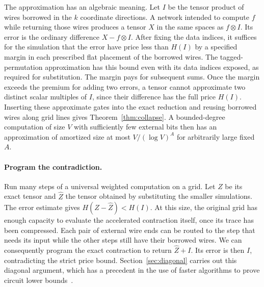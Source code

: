 The approximation has an algebraic meaning. Let \(I\) be the tensor
product of wires borrowed in the \(k\) coordinate directions. A
network intended to compute \(f\) while returning those wires produces
a tensor \(X\) in the same spaces as \(f\otimes I\). Its error is the
ordinary difference \(X-f\otimes I\). After fixing the data indices,
it suffices for the simulation that the error have price less than
\(H(I)\) by a specified margin in each prescribed flat placement of
the borrowed wires. The tagged-permutation approximation has this
bound even with its data indices exposed, as required for substitution. The
margin pays for subsequent sums. Once the margin exceeds the premium for adding two errors, a tensor
cannot approximate two distinct scalar multiples of \(I\), since their
difference has the full price \(H(I)\). Inserting these approximate gates into the exact
reduction and reusing borrowed wires along grid lines gives
Theorem~\ref{thm:collapse}. A bounded-degree computation of size \(V\)
with sufficiently few external bits then has an approximation of amortized
size at most \(V/(\log V)^A\) for arbitrarily large fixed \(A\).

\paragraph{Program the contradiction.}
Run many steps of a universal weighted computation on a grid. Let \(Z\)
be its exact tensor and \(\widehat Z\) the tensor obtained by substituting
the smaller simulations. The error estimate gives
\(H(Z-\widehat Z)<H(I)\). At this size, the original grid has enough
capacity to evaluate the accelerated contraction itself, once its trace
has been compressed. Each pair of external wire ends can be routed to
the step that needs its input while the other steps still have their
borrowed wires. We can consequently program the exact contraction to
return \(\widehat Z+I\). Its error is then \(I\), contradicting the
strict price bound. Section~\ref{sec:diagonal} carries out this
diagonal argument, which has a precedent in the use of faster
algorithms to prove circuit lower bounds~\cite{williams}.
